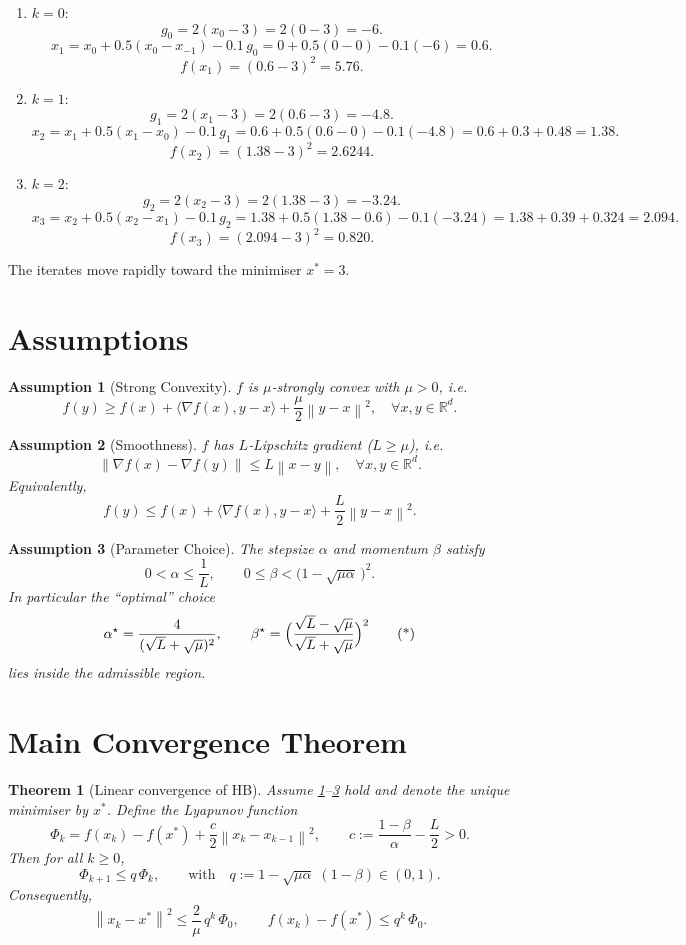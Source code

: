 \documentclass{article}
\newtheorem{theorem}{Theorem}
\newtheorem{assumption}{Assumption}
\newcommand{\R}{\mathbb{R}}
\newcommand{\norm}[1]{\left\lVert #1\right\rVert}
\newcommand{\ip}[2]{\langle #1,#2\rangle}
\newcommand{\grad}{\nabla}
\begin{document}
\begin{enumerate}[label=Iteration \arabic*:, leftmargin=*]
\item $k=0$:
\[
g_{0}=2(x_{0}-3)=2(0-3)=-6.
\]
\[
x_{1}=x_{0}+0.5(x_{0}-x_{-1})-0.1\,g_{0}
=0+0.5(0-0)-0.1(-6)=0.6.
\]
\[
f(x_{1})=(0.6-3)^{2}=5.76.
\]

\item $k=1$:
\[
g_{1}=2(x_{1}-3)=2(0.6-3)=-4.8.
\]
\[
x_{2}=x_{1}+0.5(x_{1}-x_{0})-0.1\,g_{1}
=0.6+0.5(0.6-0)-0.1(-4.8)=0.6+0.3+0.48=1.38.
\]
\[
f(x_{2})=(1.38-3)^{2}=2.6244.
\]

\item $k=2$:
\[
g_{2}=2(x_{2}-3)=2(1.38-3)=-3.24.
\]
\[
x_{3}=x_{2}+0.5(x_{2}-x_{1})-0.1\,g_{2}
=1.38+0.5(1.38-0.6)-0.1(-3.24)
=1.38+0.39+0.324=2.094.
\]
\[
f(x_{3})=(2.094-3)^{2}=0.820.
\]
\end{enumerate}
The iterates move rapidly toward the minimiser $x^{*}=3$.

\newpage

\section*{Assumptions}
\begin{assumption}[Strong Convexity]\label{ass:strong}
$f$ is $\mu$‑strongly convex with $\mu>0$, i.e.
\[
f(y)\ge f(x)+\ip{\grad f(x)}{y-x}+\frac{\mu}{2}\norm{y-x}^{2},
\quad\forall x,y\in\R^{d}.
\]
\end{assumption}
\begin{assumption}[Smoothness]\label{ass:smooth}
$f$ has $L$‑Lipschitz gradient ($L\ge\mu$), i.e.
\[
\norm{\grad f(x)-\grad f(y)}\le L\norm{x-y},
\quad\forall x,y\in\R^{d}.
\]
Equivalently,
\[
f(y)\le f(x)+\ip{\grad f(x)}{y-x}+\frac{L}{2}\norm{y-x}^{2}.
\]
\end{assumption}
\begin{assumption}[Parameter Choice]\label{ass:param}
The stepsize $\alpha$ and momentum $\beta$ satisfy
\[
0<\alpha\le\frac{1}{L},\qquad
0\le\beta<\bigl(1-\sqrt{\mu\alpha}\,\bigr)^{2}.
\]
In particular the “optimal” choice
\[
\alpha^{\star}=\frac{4}{(\sqrt{L}+\sqrt{\mu})^{2}},\qquad
\beta^{\star}= \Bigl(\frac{\sqrt{L}-\sqrt{\mu}}{\sqrt{L}+\sqrt{\mu}}\Bigr)^{2}
\tag{*}
\]
lies inside the admissible region.
\end{assumption}

\section*{Main Convergence Theorem}
\begin{theorem}[Linear convergence of HB]\label{thm:linear}
Assume \ref{ass:strong}–\ref{ass:param} hold and denote the unique minimiser by $x^{*}$.  
Define the Lyapunov function
\[
\Phi_{k}= f(x_{k})-f(x^{*})+\frac{c}{2}\norm{x_{k}-x_{k-1}}^{2},
\qquad c:=\frac{1-\beta}{\alpha}-\frac{L}{2}>0.
\]
Then for all $k\ge0$,
\[
\Phi_{k+1}\le q\,\Phi_{k},
\qquad\text{with}\quad
q:=1-\sqrt{\mu\alpha}\;(1-\beta) \in (0,1).
\tag{1}
\]
Consequently,
\[
\norm{x_{k}-x^{*}}^{2}\le
\frac{2}{\mu}\,q^{k}\,\Phi_{0},
\qquad
f(x_{k})-f(x^{*})\le q^{k}\,\Phi_{0}.
\]
\end{theorem}
\end{document}
